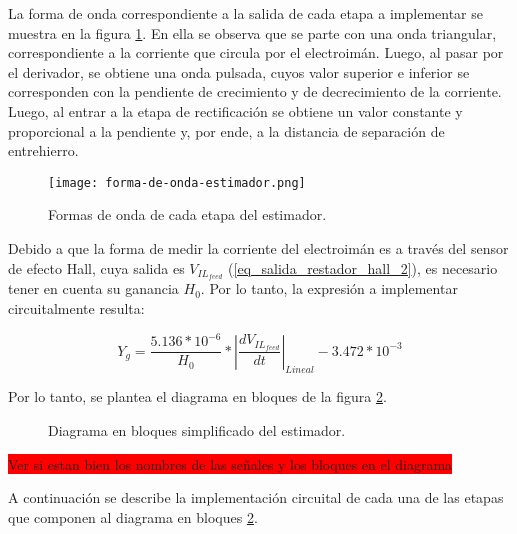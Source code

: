 La forma de onda correspondiente a la salida de cada etapa a implementar se muestra en la figura \ref{fig:img_forma-de-onda-estimador}. En ella se observa que se parte con una onda triangular, correspondiente a la corriente que circula por el electroimán. Luego, al pasar por el derivador, se obtiene una onda pulsada, cuyos valor superior e inferior se corresponden con la pendiente de crecimiento y de decrecimiento de la corriente. Luego, al entrar a la etapa de rectificación se obtiene un valor constante y proporcional a la pendiente y, por ende, a la distancia de separación de entrehierro.


\begin{figure}[H]
	\centering
	\texttt{[image: forma-de-onda-estimador.png]}
	\caption{Formas de onda de cada etapa del estimador.}
	\label{fig:img_forma-de-onda-estimador}
\end{figure}



Debido a que la forma de medir la corriente del electroimán es a través del sensor de efecto Hall, cuya salida es $V_{IL_{feed}}$ (\ref{eq_salida_restador_hall_2}), es necesario tener en cuenta su ganancia $H_0$. Por lo tanto, la expresión a implementar circuitalmente resulta:

\begin{equation} \label{eq_Yg_salida_sensor}
	Y_g=\frac{5.136*10^{-6}}{H_0}*{\left|\frac{dV_{IL_{feed}}}{dt}\right|}_{Lineal} - 3.472*10^{-3}
\end{equation}


Por lo tanto, se plantea el diagrama en bloques de la figura \ref{fig:img_diag-en-bloques_estimador}.

\begin{figure}[H]
	\centering
	
	\caption{Diagrama en bloques simplificado del estimador.}	\label{fig:img_diag-en-bloques_estimador}
\end{figure}
\colorbox{red}{Ver si estan bien los nombres de las señales y los bloques en el diagrama}

A continuación se describe la implementación circuital de cada una de las etapas que componen al diagrama en bloques \ref{fig:img_diag-en-bloques_estimador}.

